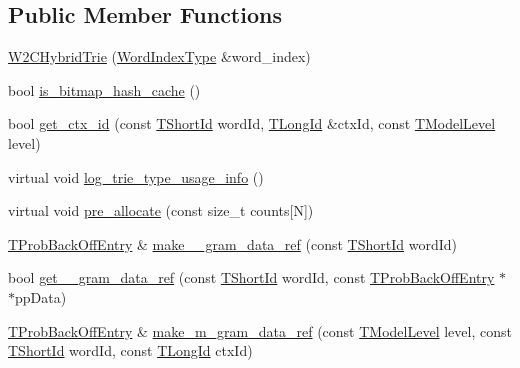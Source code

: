 \subsection*{Public Member Functions}
\begin{DoxyCompactItemize}
\item 
\hyperlink{classuva_1_1smt_1_1tries_1_1_w2_c_hybrid_trie_a0e20a7cfca02bb286b8576071bb340b4}{W2\+C\+Hybrid\+Trie} (\hyperlink{classuva_1_1smt_1_1tries_1_1_word_index_trie_base_a30c4fffe3a3423c87b229b66340dd2f8}{Word\+Index\+Type} \&word\+\_\+index)
\item 
bool \hyperlink{classuva_1_1smt_1_1tries_1_1_w2_c_hybrid_trie_a4ac4942927832a759b11984809dab5a8}{is\+\_\+bitmap\+\_\+hash\+\_\+cache} ()
\item 
bool \hyperlink{classuva_1_1smt_1_1tries_1_1_w2_c_hybrid_trie_a62e905c5540f3ded21718903663aba21}{get\+\_\+ctx\+\_\+id} (const \hyperlink{namespaceuva_1_1smt_1_1hashing_adcf22e1982ad09d3a63494c006267469}{T\+Short\+Id} word\+Id, \hyperlink{namespaceuva_1_1smt_1_1hashing_a5992ac0dea0fb3226fb403ede09fad55}{T\+Long\+Id} \&ctx\+Id, const \hyperlink{namespaceuva_1_1smt_1_1tries_a20577a44b3a42d26524250634379b7cb}{T\+Model\+Level} level)
\item 
virtual void \hyperlink{classuva_1_1smt_1_1tries_1_1_w2_c_hybrid_trie_ac6583adfa1e9088eaa38def3202da598}{log\+\_\+trie\+\_\+type\+\_\+usage\+\_\+info} ()
\item 
virtual void \hyperlink{classuva_1_1smt_1_1tries_1_1_w2_c_hybrid_trie_a629a73fe6a04cd50b876a164d06ed7e8}{pre\+\_\+allocate} (const size\+\_\+t counts\mbox{[}N\mbox{]})
\item 
\hyperlink{structuva_1_1smt_1_1tries_1_1_t_prob_back_off_entry}{T\+Prob\+Back\+Off\+Entry} \& \hyperlink{classuva_1_1smt_1_1tries_1_1_w2_c_hybrid_trie_a35808cad6f9558ba71cafd37b1a5124f}{make\+\_\+\_\+gram\+\_\+data\+\_\+ref} (const \hyperlink{namespaceuva_1_1smt_1_1hashing_adcf22e1982ad09d3a63494c006267469}{T\+Short\+Id} word\+Id)
\item 
bool \hyperlink{classuva_1_1smt_1_1tries_1_1_w2_c_hybrid_trie_a452387e61436cb715d533d94dbf4763d}{get\+\_\+\_\+gram\+\_\+data\+\_\+ref} (const \hyperlink{namespaceuva_1_1smt_1_1hashing_adcf22e1982ad09d3a63494c006267469}{T\+Short\+Id} word\+Id, const \hyperlink{structuva_1_1smt_1_1tries_1_1_t_prob_back_off_entry}{T\+Prob\+Back\+Off\+Entry} $\ast$$\ast$pp\+Data)
\item 
\hyperlink{structuva_1_1smt_1_1tries_1_1_t_prob_back_off_entry}{T\+Prob\+Back\+Off\+Entry} \& \hyperlink{classuva_1_1smt_1_1tries_1_1_w2_c_hybrid_trie_a1f4db37830c4c3561095a6244ddbbc03}{make\+\_\+m\+\_\+gram\+\_\+data\+\_\+ref} (const \hyperlink{namespaceuva_1_1smt_1_1tries_a20577a44b3a42d26524250634379b7cb}{T\+Model\+Level} level, const \hyperlink{namespaceuva_1_1smt_1_1hashing_adcf22e1982ad09d3a63494c006267469}{T\+Short\+Id} word\+Id, const \hyperlink{namespaceuva_1_1smt_1_1hashing_a5992ac0dea0fb3226fb403ede09fad55}{T\+Long\+Id} ctx\+Id)
$$
\end{DoxyCompactItemize}
